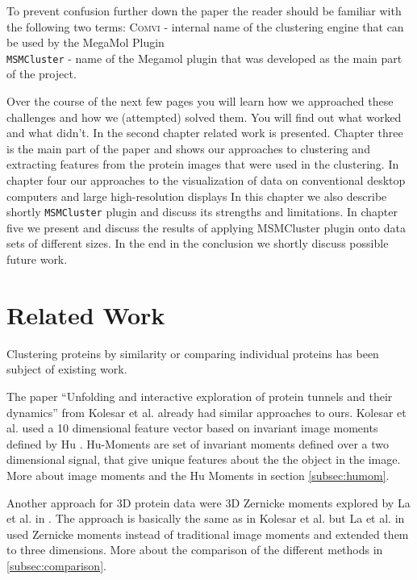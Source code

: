 \documentclass[journal]{vgtc}       %
\begin{document}
To prevent confusion further down the paper  the reader should be familiar with the following two terms: \textsc{Comvi} - internal name of the clustering engine that can be used by the MegaMol Plugin \\
\verb|MSMCluster| - name of the Megamol plugin that was developed as the main part of the project.

Over the course of the next few pages you will learn how we approached these challenges and how we (attempted) solved them. You will find out what  worked and what didn't. In the second chapter related work is presented. Chapter three is the main part of the paper and shows our approaches to clustering and extracting features from the protein images that were used in the clustering. In chapter four our approaches to the visualization of data on conventional desktop computers and large high-resolution displays In this chapter we also describe shortly \verb|MSMCluster| plugin and discuss its strengths and limitations. In chapter five we present and discuss the results of applying MSMCluster plugin onto data sets of different sizes. In the end in the conclusion we shortly discuss possible future work.


\section{Related Work}\label{sec:relatedWork}

Clustering proteins by similarity or comparing individual proteins has been subject of existing work.

The paper ``Unfolding and interactive exploration of protein tunnels and their dynamics'' \cite{kolesar} from Kolesar et al.  already had similar approaches to ours. Kolesar et al. used a 10 dimensional feature vector based on invariant image moments defined by Hu \cite{humoments}. Hu-Moments are set of invariant moments defined over a two dimensional signal, that give unique features about the the object in the image. More about image moments and the Hu Moments in section \ref{subsec:humom}.


Another approach for 3D protein data were 3D Zernicke moments explored by La et al. in \cite{3dsurfer}. The approach is basically the same as in Kolesar et al. but La et al.  in \cite{3dsurfer} used Zernicke moments instead of traditional image moments and extended them to three dimensions. More about the comparison of the different methods in \ref{subsec:comparison}.
 
\end{document}
